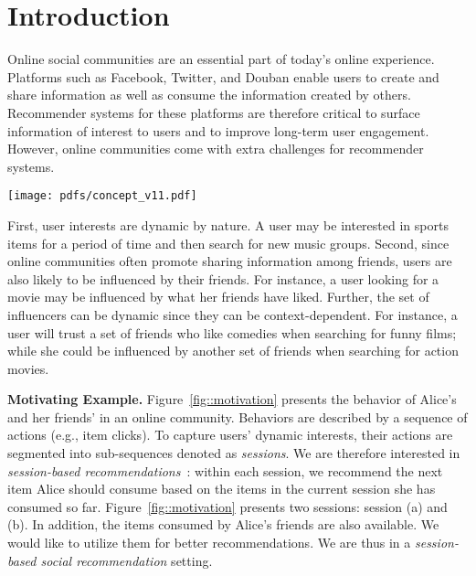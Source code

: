 \documentclass[sigconf]{acmart}
\begin{document}


\maketitle

\section{Introduction}
\label{sec::intro}

\noindent Online social communities are an essential part of today's online experience. 
Platforms such as Facebook, Twitter, and Douban enable users to create and share information as well as consume the information created by others. Recommender systems for these platforms are therefore critical to surface information of interest to users and to improve long-term user engagement. However, online communities come with extra challenges for recommender systems.

\begin{figure*} [!ptb]
\centering
\texttt{[image: pdfs/concept\_v11.pdf]}
\caption{An illustration of Alice's social influences in two sessions. Alice's interests might change across different sessions, while she may be influenced by her friends, by either their short-term or long-term preferences at different times.
}
\label{fig::motivation}
\end{figure*}

First, user interests are dynamic by nature. A user may be interested in sports items for a period of time and then search for new music groups. Second, since online communities often promote sharing information among friends, users are also likely to be influenced by their friends. For instance, a user looking for a movie may be influenced by what her friends have liked. 
Further, the set of influencers can be dynamic since they can be context-dependent. For instance, a user will trust a set of friends who like comedies when searching for funny films; while she could be influenced by another set of friends when searching for action movies.

\noindent \textbf{Motivating Example.} Figure~\ref{fig::motivation} presents the behavior of Alice's and her friends' in an online community. Behaviors are described by a sequence of actions (e.g., item clicks). To capture users' dynamic interests, their actions are segmented into sub-sequences denoted as \emph{sessions}. We are therefore interested in \emph{session-based recommendations}~\cite{schafer1999recommender}: within each session, we recommend the next item Alice should consume based on the items in the current session she has consumed so far.
Figure~\ref{fig::motivation} presents two sessions: session (a) and (b). 
In addition, the items consumed by Alice's friends are also available. We would like to utilize them for better recommendations. We are thus in a \emph{session-based social recommendation} setting.
\end{document}
